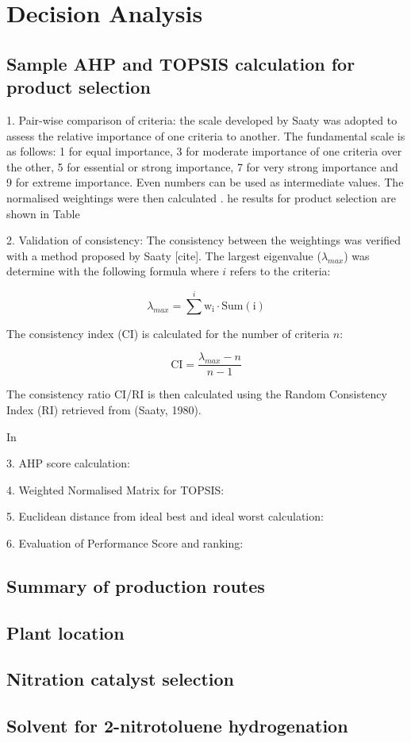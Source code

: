 \section{Decision Analysis}
\label{app:matrix}

\subsection{Sample AHP and TOPSIS calculation for product selection}

1. Pair-wise comparison of criteria: the scale developed by Saaty was adopted to assess the relative importance of one criteria to another. The fundamental scale is as follows: 1 for equal importance, 3 for moderate importance of one criteria over the other, 5 for essential or strong importance, 7 for very strong importance and 9 for extreme importance. Even numbers can be used as intermediate values. The normalised weightings were then calculated . he results for product selection are shown in Table


2. Validation of consistency: The consistency between the weightings was verified with a method proposed by Saaty [cite]. The largest eigenvalue ($\lambda_{max}$) was determine with the following formula where $i$ refers to the criteria:

\begin{equation}
    \lambda_{max}=\sum^{i} \mathrm{w_{i}}\cdot \mathrm{Sum(i)}
\end{equation}

The consistency index (CI) is calculated for the number of criteria $n$:

\begin{equation}
   \mathrm{CI} = \frac{\lambda_{max}-n}{n-1}
\end{equation}

The consistency ratio CI/RI is then calculated using the Random Consistency Index (RI) retrieved from (Saaty, 1980). 

In

3. AHP score calculation:

4. Weighted Normalised Matrix for TOPSIS:

5. Euclidean distance from ideal best and ideal worst calculation:

6. Evaluation of Performance Score and ranking:

\subsection{Summary of production routes}

\subsection{Plant location}

\subsection{Nitration catalyst selection}

\subsection{Solvent for 2-nitrotoluene hydrogenation}

